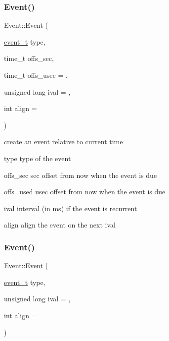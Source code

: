 \subsubsection{\texorpdfstring{Event()}{Event()}\hspace{0.1cm}{\footnotesize\ttfamily [2/3]}}
{\footnotesize\ttfamily Event\+::\+Event (\begin{DoxyParamCaption}\item[{\hyperlink{Event_8h_a2fb9b58e4e5f14f40af8b4a1425841f8}{event\+\_\+t}}]{type,  }\item[{time\+\_\+t}]{offs\+\_\+sec,  }\item[{time\+\_\+t}]{offs\+\_\+usec = {},  }\item[{unsigned long}]{ival = {},  }\item[{int}]{align = {} }\end{DoxyParamCaption})}



create an event relative to current time 

\begin{DoxyItemize}
\item {\ttfamily type} type of the event \item {\ttfamily offs\+\_\+sec} sec offset from now when the event is due \item {\ttfamily offs\+\_\+used} usec offset from now when the event is due \item {\ttfamily ival} interval (in ms) if the event is recurrent \item {\ttfamily align} align the event on the next ival \end{DoxyItemize}
\mbox{\label{classEvent_a9fa90b8cff91b5d58a7fbd690e1bcfaa}} 
\subsubsection{\texorpdfstring{Event()}{Event()}\hspace{0.1cm}{\footnotesize\ttfamily [3/3]}}
{\footnotesize\ttfamily Event\+::\+Event (\begin{DoxyParamCaption}\item[{\hyperlink{Event_8h_a2fb9b58e4e5f14f40af8b4a1425841f8}{event\+\_\+t}}]{type,  }\item[{unsigned long}]{ival = {},  }\item[{int}]{align = {} }\end{DoxyParamCaption})}




